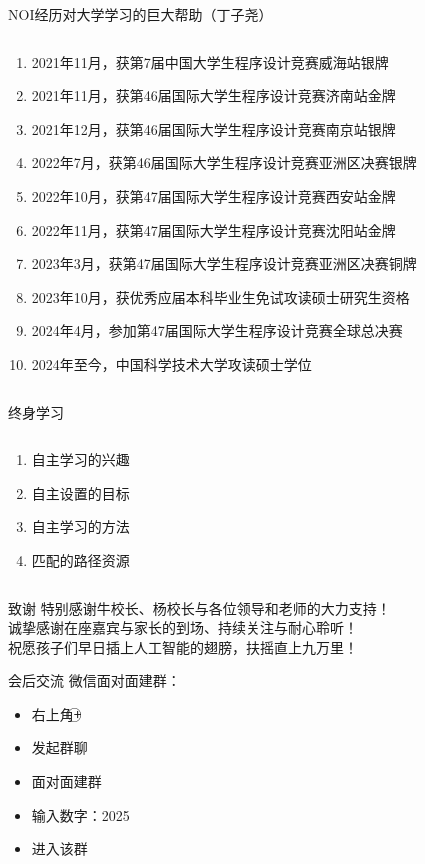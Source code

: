\documentclass{beamer}
\begin{document}
\begin{frame}[t]{NOI经历对大学学习的巨大帮助（丁子尧）}
\begin{columns}
\begin{spacing}{1.1}
\large
    \begin{enumerate}[label={\arabic*.}]
    \item 2021年11月，获第7届中国大学生程序设计竞赛威海站银牌
	\item 2021年11月，获第46届国际大学生程序设计竞赛济南站金牌
	\item 2021年12月，获第46届国际大学生程序设计竞赛南京站银牌
	\item 2022年7月，获第46届国际大学生程序设计竞赛亚洲区决赛银牌
	\item 2022年10月，获第47届国际大学生程序设计竞赛西安站金牌
	\item 2022年11月，获第47届国际大学生程序设计竞赛沈阳站金牌
	\item 2023年3月，获第47届国际大学生程序设计竞赛亚洲区决赛铜牌
	\item 2023年10月，获优秀应届本科毕业生免试攻读硕士研究生资格
	\item 2024年4月，参加第47届国际大学生程序设计竞赛全球总决赛
	\item 2024年至今，中国科学技术大学攻读硕士学位
\end{enumerate}
\end{spacing} 
\end{columns}
\end{frame}

\begin{frame}[t]{终身学习}
\begin{columns}
\begin{spacing}{1.1}
\large
    \begin{enumerate}[label={\arabic*.}]
    \item 自主学习的兴趣
	\item 自主设置的目标
	\item 自主学习的方法
	\item 匹配的路径资源
\end{enumerate}
\end{spacing} 
\end{columns}
\end{frame}

\begin{frame}[t]{致谢}
\large
\centering
\vspace*{4cm}
特别感谢牛校长、杨校长与各位领导和老师的大力支持！\\
\vspace*{1cm}
诚挚感谢在座嘉宾与家长的到场、持续关注与耐心聆听！\\
\vspace*{1cm}
祝愿孩子们早日插上人工智能的翅膀，扶摇直上九万里！
\end{frame}

\begin{frame}[t]{会后交流}
微信面对面建群：\\
\begin{itemize}
    \item 右上角\textcircled{+}
    \item 发起群聊
    \item 面对面建群
    \item 输入数字：\alert{2025}
    \item 进入该群
    \end{itemize}
\end{frame}
\end{document}
